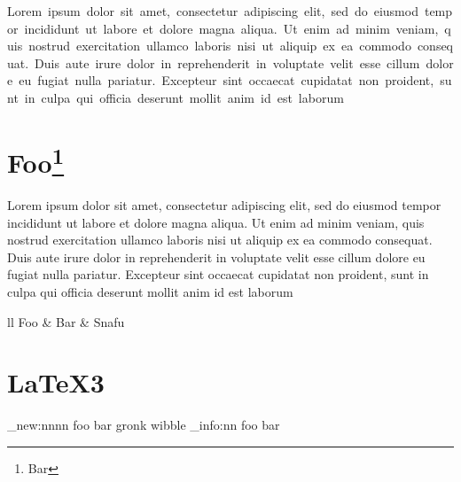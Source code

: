 \documentclass{article}
\begin{document}
  \begin{center}
    \hbox{Lorem ipsum dolor sit amet, consectetur adipiscing elit, sed do eiusmod tempor incididunt ut labore et dolore magna aliqua. Ut enim ad minim
    veniam, quis nostrud exercitation ullamco laboris nisi ut aliquip ex ea commodo consequat. Duis aute irure dolor in reprehenderit in voluptate
    velit esse cillum dolore eu fugiat nulla pariatur. Excepteur sint occaecat cupidatat non proident, sunt in culpa qui officia deserunt mollit anim
    id est laborum} \\
  \end{center}

  \section{Foo\footnote{Bar}}

  Lorem ipsum dolor sit amet, consectetur adipiscing elit, sed do eiusmod tempor incididunt ut labore et dolore magna aliqua. Ut enim ad minim
  veniam, quis nostrud exercitation ullamco laboris nisi ut aliquip ex ea commodo consequat. Duis aute irure dolor in reprehenderit in voluptate
  velit esse cillum dolore eu fugiat nulla pariatur. Excepteur sint occaecat cupidatat non proident, sunt in culpa qui officia deserunt mollit anim
  id est laborum

  \begin{tabular}{ll}
    Foo & Bar & Snafu \\
  \end{tabular}


  \PackageError{bar}{Significant package issue}{RTFM!}

  \section{\LaTeX3}
  
  \ExplSyntaxOn
  \msg_new:nnnn {foo} {bar} {gronk} {wibble}
  \msg_info:nn {foo} {bar}
  \ExplSyntaxOff

  
\end{document}
